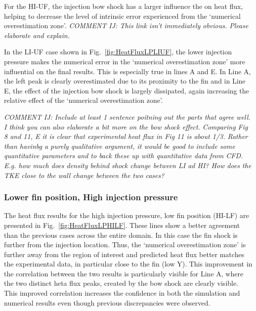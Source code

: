 \documentclass{AIAA}
\begin{document}
For the HI-UF, the injection bow shock has a larger influence the on heat flux, helping to decrease the level of intrinsic error experienced from the `numerical overestimation zone'.
{\it COMMENT IJ: This link isn't immediately obvious. Please elaborate and explain.}

In the LI-UF case shown in Fig.~\ref{fig:HeatFluxLPLIUF}, the lower injection pressure makes the numerical error in the `numerical overestimation zone' more influential on the final results.
This is especially true in lines A and E.
In Line A, the left peak is clearly overestimated due to its proximity to the fin and in Line E, the effect of the injection bow shock is largely dissipated, again increasing the relative effect of the `numerical overestimation zone'.

{\it COMMENT IJ: Include at least 1 sentence poitning out the parts  that agree well. I think you can also elaborate a bit more on the bow shock effect. Comparing Fig 8 and 11, E it is clear that experimental heat flux in Fig 11 is about 1/3. Rather than havinbg a purely qualitative argument, it would be good to include some quantitative parameters and to back these up with quantitative data from CFD. E.g. how much does density behind shock change between LI ad HI? How does the TKE close to the wall change between the two cases?}


\subsubsection{Lower fin position, High injection pressure}

The heat flux results for the high injection pressure, low fin position (HI-LF) are presented in Fig.~\ref{fig:HeatFluxLPHILF}.
These lines show a better agreement than the previous cases across the entire domain.
In this case the fin shock is further from the injection location. 
Thus, the `numerical overestimation zone' is further away from the region of interest and predicted heat flux better matches the experimental data, in particular close to the fin (low Y). 
This improvement in the correlation between the two results is particularly visible for Line A, where the two distinct heta flux peaks, created by the bow shock are clearly visible.
This improved correlation increases the confidence in both the simulation and numerical results even though previous discrepancies were observed. 
\end{document}
